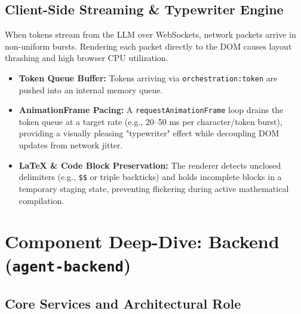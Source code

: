 \documentclass[10pt,a4paper]{article}
\begin{document}
\subsection{Client-Side Streaming \& Typewriter Engine}
When tokens stream from the LLM over WebSockets, network packets arrive in non-uniform bursts. Rendering each packet directly to the DOM causes layout thrashing and high browser CPU utilization.
\begin{itemize}[leftmargin=*]
    \item \textbf{Token Queue Buffer:} Tokens arriving via \texttt{orchestration:token} are pushed into an internal memory queue.
    \item \textbf{AnimationFrame Pacing:} A \texttt{requestAnimationFrame} loop drains the token queue at a target rate (e.g., 20--50 ms per character/token burst), providing a visually pleasing "typewriter" effect while decoupling DOM updates from network jitter.
    \item \textbf{LaTeX \& Code Block Preservation:} The renderer detects unclosed delimiters (e.g., \texttt{\$\$} or triple backticks) and holds incomplete blocks in a temporary staging state, preventing flickering during active mathematical compilation.
\end{itemize}

\section{Component Deep-Dive: Backend (\texttt{agent-backend})}

\subsection{Core Services and Architectural Role}
\end{document}
